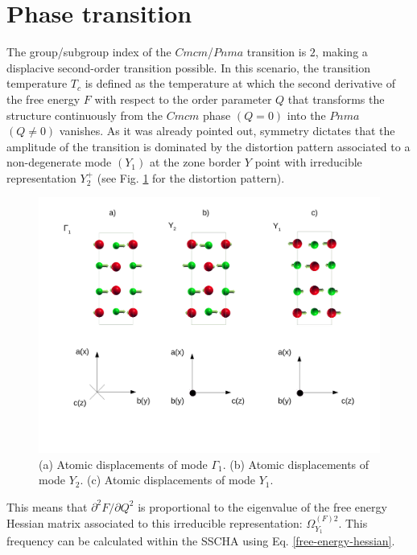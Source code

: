 \section{Phase transition}

The group/subgroup index of the $Cmcm$/$Pnma$ transition is $2$, making a displacive second-order transition possible\cite{toledano1987landau}. In this scenario, the transition temperature $T_{c}$ is defined as the temperature 
at which the second derivative of the free energy $F$ with respect to the order parameter $Q$ that transforms the structure continuously from the $Cmcm$ phase $(Q=0)$ into the $Pnma$ $(Q\ne0)$ vanishes. As it was already 
pointed out\cite{chattopadhyay1986neutron}, symmetry\cite{orobengoa2009amplimodes,perez2010mode} dictates that the amplitude of the transition is dominated by the distortion pattern associated to a non-degenerate mode $(Y_{1})$
at the zone border $Y$ point with irreducible representation $Y_{2}^{+}$ (see Fig. \ref{patterns} for the distortion pattern).
\begin{figure}[h]
\begin{center}
\includegraphics[width=0.8\linewidth]{Figures/normal-modes.pdf}
	\caption[Phonon eigenvector patterns in $Cmcm$ SnSe.]{(a) Atomic displacements of mode $\Gamma_{1}$. (b) 
	Atomic 	displacements of mode $Y_{2}$. (c) Atomic displacements of mode $Y_{1}$.}
\label{patterns}
\end{center}
\end{figure}
This means that $\partial^{2}F/\partial Q^{2}$ is proportional to the eigenvalue of the free energy Hessian matrix associated to this irreducible representation: $\Omega^{(F)2}_{Y_{1}}$. This frequency can be calculated within the 
SSCHA using Eq. \ref{free-energy-hessian}. \\

